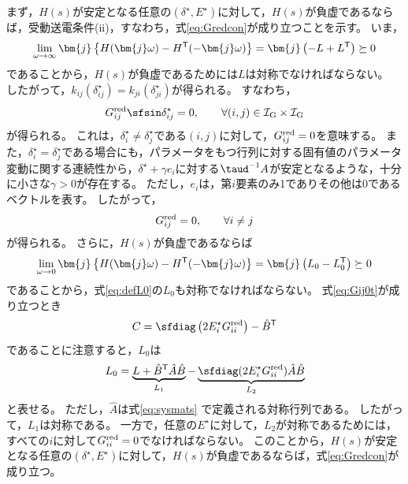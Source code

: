 \documentclass[tombow,dvipdfmx]{corona-a5-1.1}
\begin{document}
\begin{証明}
まず，$H(s)$が安定となる任意の$(\delta^{\star},E^{\star})$に対して，$H(s)$が負虚であるならば，受動送電条件(ii)，すなわち，式\ref{eq:Gredcon}が成り立つことを示す。
いま，
\[
\lim_{\omega \rightarrow \infty} \bm{j}
\left\{
H(\bm{j}\omega)-H^{\sf T}(-\bm{j}\omega)
\right\}
=\bm{j}
\left(
-L+L^{\sf T}
\right) \succeq 0
\]
であることから，$H(s)$が負虚であるためには$L$は対称でなければならない。
したがって，$k_{ij}(\delta_{ij}^{\star}) = k_{ji}(\delta_{ji}^{\star})$が得られる。
すなわち，
\[
G^{\rm red}_{ij} \sfsin \delta_{ij}^{\star} = 0 ,\qquad
\forall (i, j) \in \mathcal{I}_{\rm G} \times \mathcal{I}_{\rm G}
\]
が得られる。
これは，$\delta_{i}^{\star}\neq \delta_{j}^{\star}$である$(i,j)$に対して，$G^{\rm red}_{ij}=0$を意味する。
また，$\delta_{i}^{\star}= \delta_{j}^{\star}$である場合にも，パラメータをもつ行列に対する固有値のパラメータ変動に関する連続性から，$\delta^{\star}+\gamma e_i$に対する$\taud^{-1}A$が安定となるような，十分に小さな$\gamma>0$が存在する。
ただし，$e_i$は，第$i$要素のみ1でありその他は0であるベクトルを表す。
したがって，
\begin{align}\label{eq:Gij0t}
G^{\rm red}_{ij}=0, \qquad
\forall i\neq j
\end{align}
が得られる。
さらに，$H(s)$が負虚であるならば
\[
\lim_{\omega \rightarrow 0} \bm{j}
\left\{
H(\bm{j}\omega)-H^{\sf T}(-\bm{j}\omega)
\right\}
=\bm{j}
\left(
L_0-L_0^{\sf T}
\right) \succeq 0
\]
であることから，式\ref{eq:defL0}の$L_0$も対称でなければならない。
式\ref{eq:Gij0t}が成り立つとき
\[
C = \sfdiag \left(
2E_i^{\star} G^{\rm red}_{ii}
\right)  - \hat{B}^{\sf T}
\]
であることに注意すると，$L_0$は
\[
L_0 = \underbrace{ L + \hat{B}^{\sf T} \hat{A} \hat{B} }_{L_1}
-
\underbrace{ \sfdiag (
2 E_i^{\star} G^{\rm red}_{ii}
) \hat{A} \hat{B}
}_{L_2}
\]
と表せる。
ただし，$\hat{A}$は式\ref{eq:sysmats}
で定義される対称行列である。
したがって，$L_1$は対称である。
一方で，任意の$E^{\star}$に対して，$L_2$が対称であるためには，すべての$i$に対して$G^{\rm red}_{ii}=0$でなければならない。
このことから，$H(s)$が安定となる任意の$(\delta^{\star},E^{\star})$に対して，$H(s)$が負虚であるならば，式\ref{eq:Gredcon}が成り立つ。



\end{証明}
\end{document}
